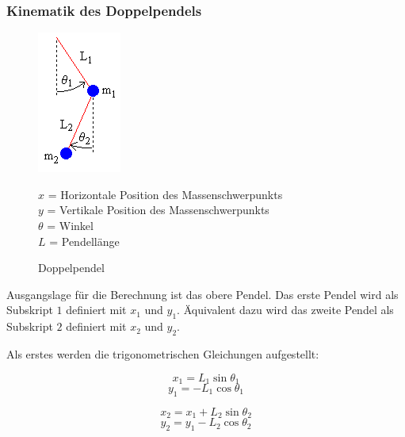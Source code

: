 \documentclass[12pt]{article}
\numberwithin{equation}{subsection}
\begin{document}
\subsubsection{Kinematik des Doppelpendels}
\begin{figure}[!h]
	\begin{minipage}[!b]{0.4\textwidth}
		\centering
		\includegraphics[scale=1]{dbl_pendulum.png}
		\caption[Doppelpendel]{Doppelpendel \citep{neumannDp04}}
		\label{fig:energy}
	\end{minipage}
	\begin{minipage}[!t]{\textwidth}
		\vspace{0pt}\raggedright
		$x$ = Horizontale Position des Massenschwerpunkts\\
		$y$ = Vertikale Position des Massenschwerpunkts\\
		$\theta$ = Winkel\\
		$L$ = Pendellänge
	\end{minipage}
\end{figure}

Ausgangslage für die Berechnung ist das obere Pendel. Das erste Pendel wird als Subskript $1$ definiert mit $x_1$ und $y_1$. Äquivalent dazu wird das zweite Pendel als Subskript $2$ definiert mit $x_2$ und $y_2$.

Als erstes werden die trigonometrischen Gleichungen aufgestellt:

\begin{equation} \label{eq:energy:1_1}
	x_1 = L_1\sin\theta_1
\end{equation}
\begin{equation} \label{eq:energy:1_2}
	y_1 = -L_1\cos\theta_1
\end{equation}

\begin{equation} \label{eq:energy:2_1}
	x_2 = x_1 + L_2\sin\theta_2
\end{equation}
\begin{equation} \label{eq:energy:2_2}
	y_2 = y_1 - L_2\cos\theta_2
\end{equation}
\end{document}
